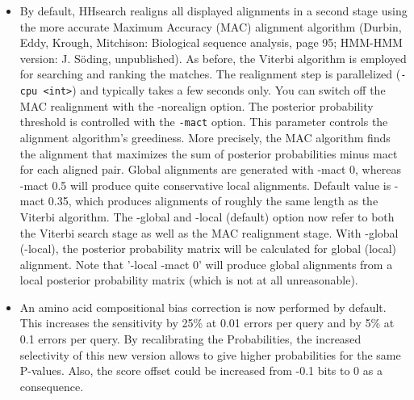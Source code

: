 \documentclass[11pt,a4paper]{article}
\begin{document}
\begin{itemize}

\item{By default, HHsearch realigns all displayed alignments in a second stage 
  using the more accurate Maximum Accuracy (MAC) alignment algorithm 
  (Durbin, Eddy, Krough, Mitchison: Biological sequence analysis, page 95;
  HMM-HMM version: J. S\"oding, unpublished). As before, the Viterbi algorithm 
  is employed for searching and ranking the matches. The realignment step is 
  parallelized (\verb`-cpu <int>`) and typically takes a few seconds only. You can 
  switch off the MAC realignment with the -norealign option. 
     The posterior probability threshold is controlled with the \verb`-mact` 
  option. This parameter controls the alignment algorithm's greediness. More 
  precisely, the MAC algorithm finds the alignment that maximizes the sum of 
  posterior probabilities minus mact for each aligned pair. Global alignments 
  are generated with -mact 0, whereas -mact 0.5 will produce quite conservative
  local alignments. Default value is -mact 0.35, which produces alignments of
  roughly the same length as the Viterbi algorithm. 
     The -global and -local (default) option now refer to both the Viterbi search 
  stage as well as the MAC realignment stage. With -global (-local), the 
  posterior probability matrix will be calculated for global (local) 
  alignment. Note that '-local -mact 0' will produce global alignments from
  a local posterior probability matrix (which is not at all unreasonable).
}
\item{An amino acid compositional bias correction is now performed by default.
  This increases the sensitivity by 25\% at 0.01 errors per query and by 5\% at 
  0.1 errors per query. By recalibrating the Probabilities, the increased 
  selectivity of this new version allows to give higher probabilities for the 
  same P-values. Also, the score offset could be increased from -0.1 bits to 0 
  as a consequence. 
}


\end{itemize}
\end{document}
